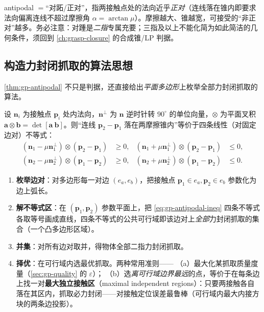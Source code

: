 \begin{note}[“对踵”一词的来历与边界]
antipodal $=$“对跖/正对”，指两接触点处的法向近乎\emph{正对}（连线落在锥内即要求法向偏离连线不超过摩擦角 $\alpha=\arctan\mu$）。摩擦越大、锥越宽，可接受的“非正对”越多。务必注意：对踵是\emph{二指}专属充要；三指及以上不能化简为如此简洁的几何条件，须回到 \cref{ch:grasp-closure} 的合成锥/LP 判据。
\end{note}

\subsection{构造力封闭抓取的算法思想}
\cref{thm:gp-antipodal} 不只是判据，还直接给出\emph{平面多边形}上枚举全部力封闭抓取的算法\cite{murray1994mathematical}。

\begin{definition}[对踵条件的线性不等式形式]\label{def:gp-antipodal-ineq}
设 $\mathbf{n}_i$ 为接触点 $\mathbf{p}_i$ 处内法向，$\mathbf{n}^\perp$ 为 $\mathbf{n}$ 逆时针转 $90^\circ$ 的单位向量，$\otimes$ 为平面叉积 $\mathbf{a}\otimes\mathbf{b}=\det[\mathbf{a}\ \mathbf{b}]$。则“连线 $\mathbf{p}_2-\mathbf{p}_1$ 落在两摩擦锥内”等价于四条线性（对固定边对）不等式：
\begin{equation}
\begin{aligned}
  (\mathbf{n}_1-\mu\mathbf{n}_1^\perp)\otimes(\mathbf{p}_2-\mathbf{p}_1)&\ge 0, &
  (\mathbf{n}_1+\mu\mathbf{n}_1^\perp)\otimes(\mathbf{p}_2-\mathbf{p}_1)&\le 0,\\
  (\mathbf{n}_2-\mu\mathbf{n}_2^\perp)\otimes(\mathbf{p}_1-\mathbf{p}_2)&\ge 0, &
  (\mathbf{n}_2+\mu\mathbf{n}_2^\perp)\otimes(\mathbf{p}_1-\mathbf{p}_2)&\le 0.
\end{aligned}
  \label{eq:gp-antipodal-ineq}
\end{equation}
\end{definition}

\begin{algo}\label{algo:gp-construct}
\hfill
\begin{enumerate}
  \item \textbf{枚举边对}：对多边形每一对边 $(e_a,e_b)$，把接触点 $\mathbf{p}_1\in e_a,\mathbf{p}_2\in e_b$ 参数化为边上弧长。
  \item \textbf{解不等式区}：在 $(\mathbf{p}_1,\mathbf{p}_2)$ 参数平面上，把 \cref{eq:gp-antipodal-ineq} 四条不等式各取等号画成直线，四条不等式的公共可行域即该边对上\emph{全部}力封闭抓取的集合（一个凸多边形区域）。
  \item \textbf{并集}：对所有边对取并，得物体全部二指力封闭抓取。
  \item \textbf{择优}：在可行域内选最优抓取。两种常用准则——
  （a）最大化某抓取质量度量（\cref{sec:gp-quality} 的 $\varepsilon$）；
  （b）选\emph{离可行域边界最远}的点，等价于在每条边上找一对\textbf{最大独立接触区}（maximal independent regions）：只要两接触各自落在其区内，抓取必力封闭——对接触定位误差最鲁棒（可行域内最大内接方块的两条边投影）。
\end{enumerate}
\end{algo}

